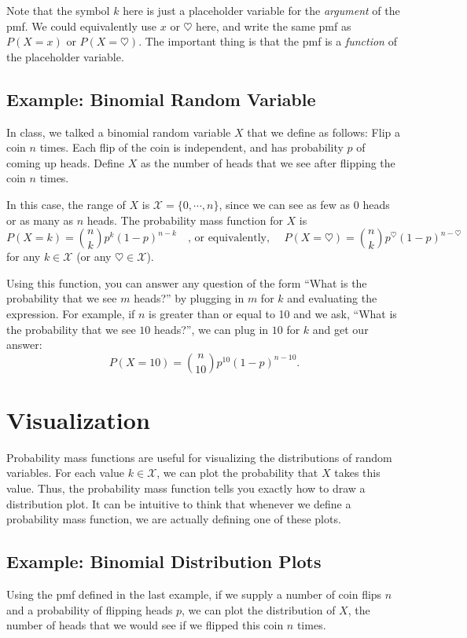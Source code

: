 \documentclass[11pt]{article}
\begin{document}
Note that the symbol $k$ here is just a placeholder variable for the \emph{argument} of the pmf. We could equivalently use $x$ or $\heartsuit$ here, and write the same pmf as $P(X = x)$ or $P(X = \heartsuit)$. The important thing is that the pmf is a \emph{function} of the placeholder variable.

\subsection*{Example: Binomial Random Variable}

In class, we talked a binomial random variable $X$ that we define as follows: Flip a coin $n$ times. Each flip of the coin is independent, and has probability $p$ of coming up heads. Define $X$ as the number of heads that we see after flipping the coin $n$ times.

In this case, the range of $X$ is $\mathcal X = \{0, \cdots, n\}$, since we can see as few as $0$ heads or as many as $n$ heads. The probability mass function for $X$ is
$$
P(X = k) = {n \choose k} p^k (1-p)^{n-k}\hspace{1em}\textrm{, or equivalently, } \hspace{1em}P(X = \heartsuit) = {n \choose k} p^{\heartsuit} (1-p)^{n-\heartsuit}
$$
for any $k \in \mathcal X$ (or any $\heartsuit \in \mathcal X$).

Using this function, you can answer any question of the form ``What is the probability that we see $m$ heads?'' by plugging in $m$ for $k$ and evaluating the expression. For example, if $n$ is greater than or equal to 10 and we ask, ``What is the probability that we see $10$ heads?'', we can plug in $10$ for $k$ and get our answer:
$$
P(X = 10) = {n \choose 10} p^{10} (1-p)^{n-10}.
$$

\section*{Visualization}
Probability mass functions are useful for visualizing the distributions of random variables. For each value $k \in \mathcal X$, we can plot the probability that $X$ takes this value. Thus, the probability mass function tells you exactly how to draw a distribution plot. It can be intuitive to think that whenever we define a probability mass function, we are actually defining one of these plots.

\subsection*{Example: Binomial Distribution Plots}
Using the pmf defined in the last example, if we supply a number of coin flips $n$ and a probability of flipping heads $p$, we can plot the distribution of $X$, the number of heads that we would see if we flipped this coin $n$ times.
\end{document}

